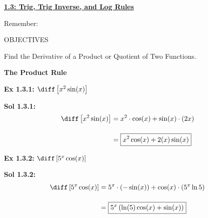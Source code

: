 \textbf{\underline{\large{1.3: Trig, Trig Inverse, and Log Rules}}} \par

Remember:
\begin{center}
\end{center}

\begin{tcolorbox}[objective]
    \begin{center}
        OBJECTIVES \\[11pt]
    \end{center}
    Find the Derivative of a Product or Quotient of Two Functions. 
\end{tcolorbox}

\bigskip

\hypertarget{Product Rule}{\textbf{\large{The Product Rule}}} \par

\begin{tcolorbox}[example]
    \textbf{Ex 1.3.1: } $\diff \left[x^2\sin (x)\right]$ 
\end{tcolorbox}
\begin{tcolorbox}[solution]
    \textbf{Sol 1.3.1: } \begin{align*}
        \diff \left[x^2\sin (x)\right] & = x^2 \cdot \cos (x) + \sin (x) \cdot (2x) \\[11pt]
        & = \boxed{x^2\cos (x) + 2(x)\sin (x)}
    \end{align*} 
\end{tcolorbox} \vspace{11pt}

\begin{tcolorbox}[example]
    \textbf{Ex 1.3.2: } $\diff \left[5^x \cos (x)\right]$
\end{tcolorbox}
\begin{tcolorbox}[solution]
    \textbf{Sol 1.3.2: } \begin{align*}
        \diff \left[5^x \cos (x)\right] & = 5^x \cdot (-\sin (x)) + \cos (x) \cdot (5^x \ln 5) \\[11pt]
        & = \boxed{5^x \left(\ln (5)\cos (x) + \sin(x)\right)}
    \end{align*}
\end{tcolorbox}

